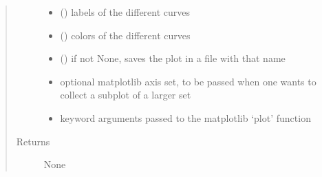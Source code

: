 \documentclass[letterpaper,10pt,english]{sphinxmanual}
\begin{document}
\begin{fulllineitems}
\begin{quote}
\begin{description}
\begin{itemize}
\item {} 
\sphinxAtStartPar
{} (\sphinxstyleliteralemphasis{\sphinxupquote{{[}}}\sphinxstyleliteralemphasis{\sphinxupquote{{]}}}) \textendash{} labels of the different curves

\item {} 
\sphinxAtStartPar
{} (\sphinxstyleliteralemphasis{\sphinxupquote{{[}}}\sphinxstyleliteralemphasis{\sphinxupquote{{]}}}) \textendash{} colors of the different curves

\item {} 
\sphinxAtStartPar
{} () \textendash{} if not None, saves the plot in a file with that name

\item {} 
\sphinxAtStartPar
{} \textendash{} optional matplotlib axis set, to be passed when one wants to collect a subplot of a larger set

\item {} 
\sphinxAtStartPar
{} \textendash{} keyword arguments passed to the matplotlib ‘plot’ function

\end{itemize}

\item[{Returns}] \leavevmode
\sphinxAtStartPar
None

\end{description}\end{quote}

\end{fulllineitems}

\end{document}
